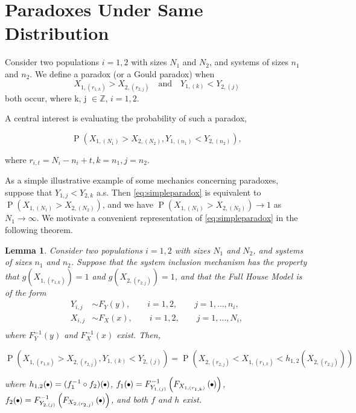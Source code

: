 \documentclass[12pt]{article}
\newcommand{\fatterdot}{\raisebox{0.15ex}{\tikz\filldraw[black,x=1.5pt,y=1.5pt] (0,0) circle (1);}}
\DeclareMathOperator*{\Prob}{P}
\newtheorem{lemma}[theorem]{Lemma}
\begin{document}
\section{Paradoxes Under Same Distribution}

Consider two populations $i = 1,2$ with sizes $N_1$ and $N_2$, and systems of sizes $n_1$ and $n_2$. We define a paradox (or a Gould paradox) when 
$$
  X_{1,(r_{1,k})} > X_{2,(r_{2,j})} \quad \text{and} \quad Y_{1,(k)} < Y_{2,(j)}
$$
both occur, where k, j $\in \mathbb{Z}$, $i = 1,2$. 

A central interest is evaluating the probability of such a paradox, 

\begin{equation} \label{eq:simpleparadox}
  \Prob\left(X_{1,(N_1)} > X_{2,(N_2)}, Y_{1,(n_1)} < Y_{2,(n_2)}\right),
\end{equation}

where $r_{i,t} = N_i - n_i + t, k = n_1, j = n_2$.

As a simple illustrative example of some mechanics concerning paradoxes, suppose that $Y_{1,j} < Y_{2,k}$ a.s. Then \eqref{eq:simpleparadox} is equivalent to $\Prob\left(X_{1,(N_1)} > X_{2,(N_2)}\right)$, and we have $\Prob\left(X_{1,(N_1)} > X_{2,(N_2)}\right) \to 1$ as $N_1 \to \infty$. We motivate a convenient representation of \eqref{eq:simpleparadox} in the following theorem.


\begin{lemma} \label{lemma:rep}
Consider two populations $i = 1,2$ with sizes $N_1$ and $N_2$, and systems of sizes $n_1$ and $n_2$. 
Suppose that the system inclusion mechanism has the property that $g(X_{1,(r_{1,k})}) = 1$ and $g(X_{2,(r_{2,j})}) = 1$, and that the Full House Model is of the form 
\begin{align*}
  Y_{i,j} &\sim F_Y(y), \qquad i = 1,2, \qquad j = 1,\ldots,n_i, \\
  X_{i,j} &\sim F_X(x), \qquad i = 1,2, \qquad j = 1,\ldots,N_i, \\
\end{align*}
where $F_Y^{-1}(y)$ and $F_X^{-1}(x)$ exist. Then,

\begin{equation} \label{eq:pararep}
  \Prob\left(X_{1,(r_{1,k})} > X_{2,(r_{2,j})}, Y_{1,(k)} < Y_{2,(j)}\right) 
  = \Prob\left( X_{2,(r_{2,j})} < X_{1,(r_{1,k})}  < h_{1,2}\left(X_{2,(r_{2,j})}\right)\right)
\end{equation}

where $h_{1,2}(\fatterdot) = (f_1^{-1} \circ f_2)(\fatterdot)$, 
$f_1(\fatterdot) = F_{Y_{1, (j)}}^{-1}\left(F_{X_{1,(r_{1,k})}}\left(\fatterdot\right)\right)$, $f_2(\fatterdot) = F_{Y_{2, (j)}}^{-1}\left(F_{X_{2,(r_{2,j})}}\left(\fatterdot\right)\right)$,
and both $f$ and $h$ exist.
\end{lemma}
\end{document}
